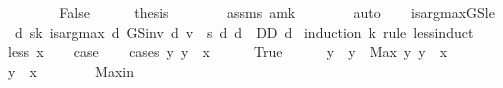 \begin{isabellebody}
\ \ \isamarkupfalse%
\isanewline
\ \ \ \ \isamarkupfalse%
\ False\isanewline
\ \ \ \ \isamarkupfalse%
\ {\isacharquery}{\kern0pt}thesis\isanewline
\ \ \ \ \ \ \isamarkupfalse%
\ assms\ am{\isacharunderscore}{\kern0pt}k\isanewline
\ \ \ \ \ \ \isamarkupfalse%
\ auto\isanewline
\ \ \isamarkupfalse%
\isanewline
{}\isamarkupfalse%
%
\endisatagproof
{\isafoldproof}%
%
\isadelimproof
\isanewline
%
\endisadelimproof
\isanewline
\isanewline
{}\isamarkupfalse%
\ is{\isacharunderscore}{\kern0pt}arg{\isacharunderscore}{\kern0pt}max{\isacharunderscore}{\kern0pt}GS{\isacharunderscore}{\kern0pt}le{\isacharcolon}{\kern0pt}\ \isanewline
\ \ {\isachardoublequoteopen}{\isasymexists}d{\isachardot}{\kern0pt}\ {\isasymforall}s{\isasymle}k{\isachardot}{\kern0pt}\ is{\isacharunderscore}{\kern0pt}arg{\isacharunderscore}{\kern0pt}max\ {\isacharparenleft}{\kern0pt}{\isasymlambda}d{\isachardot}{\kern0pt}\ GS{\isacharunderscore}{\kern0pt}inv\ d\ v\ {\isachardollar}{\kern0pt}\ s{\isacharparenright}{\kern0pt}\ {\isacharparenleft}{\kern0pt}{\isasymlambda}d{\isachardot}{\kern0pt}\ d\ {\isasymin}\ D\isactrlsub D{\isacharparenright}{\kern0pt}\ d{\isachardoublequoteclose}\isanewline
%
\isadelimproof
%
\endisadelimproof
%
\isatagproof
{}\isamarkupfalse%
\ {\isacharparenleft}{\kern0pt}induction\ k\ rule{\isacharcolon}{\kern0pt}\ less{\isacharunderscore}{\kern0pt}induct{\isacharparenright}{\kern0pt}\isanewline
\ \ \isamarkupfalse%
\ {\isacharparenleft}{\kern0pt}less\ x{\isacharparenright}{\kern0pt}\isanewline
\ \ \isamarkupfalse%
\ {\isacharquery}{\kern0pt}case\isanewline
\ \ \isamarkupfalse%
\ {\isacharparenleft}{\kern0pt}cases\ {\isachardoublequoteopen}{\isasymexists}y{\isachardot}{\kern0pt}\ y\ {\isacharless}{\kern0pt}\ x{\isachardoublequoteclose}{\isacharparenright}{\kern0pt}\isanewline
\ \ \ \ \isamarkupfalse%
\ True\isanewline
\ \ \ \ \isamarkupfalse%
\ y\ \ {\isachardoublequoteopen}y\ {\isacharequal}{\kern0pt}\ Max\ {\isacharbraceleft}{\kern0pt}y{\isachardot}{\kern0pt}\ y\ {\isacharless}{\kern0pt}\ x{\isacharbraceright}{\kern0pt}{\isachardoublequoteclose}\ \ \isanewline
\ \ \ \ \isamarkupfalse%
\ {\isachardoublequoteopen}y\ {\isacharless}{\kern0pt}\ x{\isachardoublequoteclose}\isanewline
\ \ \ \ \ \ \isamarkupfalse%
\ Max{\isacharunderscore}{\kern0pt}in\isanewline
\ \ \ \ \ \ \isamarkupfalse%

\end{isabellebody}
